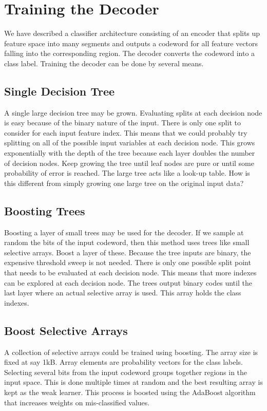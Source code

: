 \documentclass{article}
\begin{document}
\section{Training the Decoder}
We have described a classifier architecture consisting of an encoder that splits up feature space into many segments and outputs a codeword for all feature vectors falling into the corresponding region.  The decoder converts the codeword into a class label.  Training the decoder can be done by several means.

\subsection{Single Decision Tree}
A single large decision tree may be grown.  Evaluating splits at each decision node is easy because of the binary nature of the input.  There is only one split to consider for each input feature index.  This means that we could probably try splitting on all of the possible input variables at each decision node.  This grows exponentially with the depth of the tree because each layer doubles the number of decision nodes.  Keep growing the tree until leaf nodes are pure or until some probability of error is reached.  The large tree acts like a look-up table.  How is this different from simply growing one large tree on the original input data?

\subsection{Boosting Trees}
Boosting a layer of small trees may be used for the decoder.  If we sample at random the bits of the input codeword, then this method uses trees like small selective arrays.  Boost a layer of these.  Because the tree inputs are binary, the expensive threshold sweep is not needed.  There is only one possible split point that needs to be evaluated at each decision node.  This means that more indexes can be explored at each decision node.  The trees output binary codes until the last layer where an actual selective array is used.  This array holds the class indexes.

\subsection{Boost Selective Arrays}
A collection of selective arrays could be trained using boosting.  The array size is fixed at say 1kB.  Array elements are probability vectors for the class labels.  Selecting several bits from the input codeword groups together regions in the input space.  This is done multiple times at random and the best resulting array is kept as the weak learner.  This process is boosted using the AdaBoost algorithm that increases weights on mis-classified values.
\end{document}
